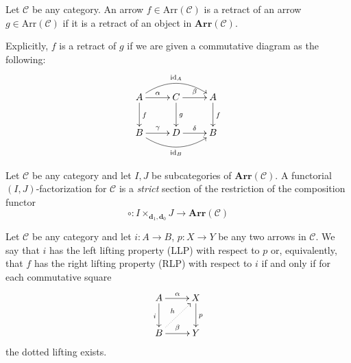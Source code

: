 \begin{refsection}
\begin{defin}
Let $\mathcal C$ be any category. An arrow $f \in \mathrm{Arr}(\mathcal C)$ is a retract of an arrow $g \in \mathrm{Arr}(\mathcal C)$ if it is a retract of an object in $\mathbf{Arr}(\mathcal C)$. 
\end{defin}

Explicitly, $f$ is a retract of $g$ if we are given a commutative diagram as the following:
\[
\xymatrix{
A \ar@/^1.25pc/[rr]^{\mathrm{id}_A} \ar[d]^f \ar[r]^\alpha & C \ar[d]^g \ar[r]^\beta & A \ar[d]^f \\ B \ar[r]^\gamma \ar@/_1.2pc/[rr]_{\mathrm{id}_B} & D \ar[r]^\delta & B
}
\]

\begin{defin}
Let $\mathcal C$ be any category and let $I,J$ be subcategories of $\mathbf{Arr}(\mathcal C)$.
A functorial $(I,J)$-factorization for $\mathcal C$ is a \emph{strict} section of the restriction of the composition functor
\[
\circ \colon I \times_{\mathbf d_1,\mathbf d_0} J \to \mathbf{Arr}(\mathcal C)
\]
\end{defin}

\begin{defin}
Let $\mathcal C$ be any category and let $i \colon A \to B$, $p \colon X \to Y$ be any two arrows in $\mathcal C$. We say that $i$ has the left lifting property (LLP) with respect to $p$ or, equivalently, that $f$ has the right lifting property (RLP) with respect to $i$ if and only if for each commutative square
\[
\xymatrix{ A \ar[d]_i \ar[r]^\alpha & X \ar[d]^p \\ B \ar[r]^\beta \ar@{.>}[ur]^h & Y }
\]
the dotted lifting exists.
\end{defin}


\end{refsection}
